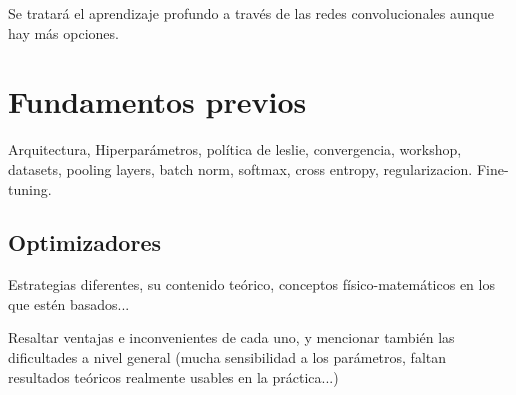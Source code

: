 Se tratará el aprendizaje profundo a través de las redes convolucionales aunque hay más opciones.

\section{Fundamentos previos}
Arquitectura, Hiperparámetros, política de leslie, convergencia, workshop, datasets, pooling layers, batch norm, softmax, cross entropy, regularizacion. Fine-tuning.

\subsection{Optimizadores}

Estrategias diferentes, su contenido teórico, conceptos físico-matemáticos en los que estén basados...

Resaltar ventajas e inconvenientes de cada uno, y mencionar también las dificultades a nivel general (mucha sensibilidad a los parámetros, faltan resultados teóricos realmente usables en la práctica...)